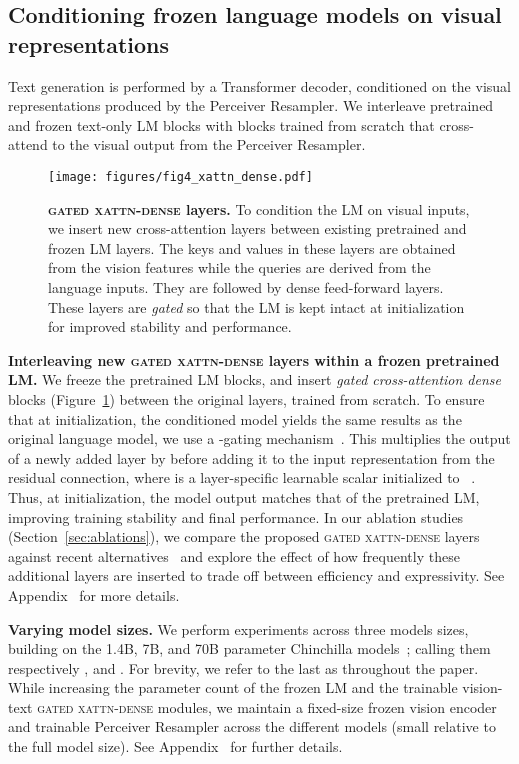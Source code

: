 \subsection{Conditioning frozen language models on visual representations}
\label{sec:xattn_dense}


Text generation is performed by a Transformer decoder, conditioned on the visual representations produced by the Perceiver Resampler. 
We interleave pretrained and frozen text-only LM blocks with blocks trained from scratch that cross-attend to the visual output from the Perceiver Resampler.


\begin{figure}[t]
\texttt{[image: figures/fig4\_xattn\_dense.pdf]}
\centering
\caption{\capfontsize{} \textbf{\textsc{gated xattn-dense} layers.} To condition the LM on visual inputs, we insert new cross-attention layers between existing pretrained and frozen LM layers. The keys and values in these layers are obtained from the vision features while the queries are derived from the language inputs.
They are followed by dense feed-forward layers.
These layers are \emph{gated} so that the LM is kept intact at initialization for improved stability and performance.}
\label{fig:xattn_dense}
\end{figure}

\textbf{Interleaving new \textsc{gated xattn-dense} layers within a frozen pretrained LM.} 
We freeze the pretrained LM blocks, and insert \textit{gated cross-attention dense} blocks (Figure~\ref{fig:xattn_dense}) between the original layers, trained from scratch.
To ensure that at initialization, the conditioned model yields the same results as the original language model, we use a -gating mechanism~\citep{hochreiter1997long}.
This multiplies the output of a newly added layer by  before adding it to the input representation from the residual connection, where  is a layer-specific learnable scalar initialized to ~\cite{bachlechner2021rezero}.
Thus, at initialization, the model output matches that of the pretrained LM, improving training stability and final performance.
In our ablation studies (Section~\ref{sec:ablations}), we compare the proposed \textsc{gated xattn-dense} layers against recent alternatives~\citep{desai2021virtex,luo2022vc} and explore the effect of how frequently these additional layers are inserted to trade off between efficiency and expressivity.
See Appendix~ for more details.

\textbf{Varying model sizes.}
We perform experiments across three models sizes, building on the 1.4B, 7B, and 70B parameter Chinchilla models~\citep{chinchilla}; calling them respectively \base{}, \medium{} and \largemfull{}.
For brevity, we refer to the last as \largem{} throughout the paper.
While increasing the parameter count of the frozen LM and the trainable vision-text \textsc{gated xattn-dense} modules, we maintain a fixed-size frozen vision encoder and trainable Perceiver Resampler across the different models (small relative to the full model size).
See Appendix~ for further details.


